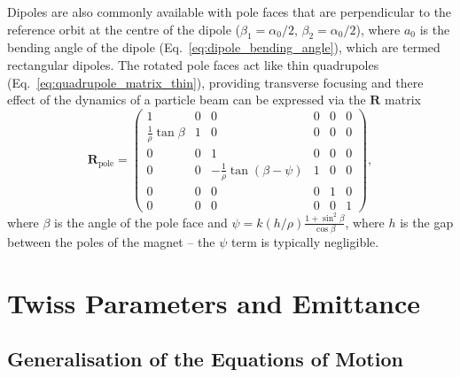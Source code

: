 \documentclass[../main.tex]{subfiles}
\begin{document}
Dipoles are also commonly available with pole faces that are perpendicular to the reference orbit at the centre of the dipole ($\beta_{1}=\alpha_{0}/2$, $\beta_{2}=\alpha_{0}/2$), where $a_{0}$ is the bending angle of the dipole (Eq.~\ref{eq:dipole_bending_angle}), which are termed rectangular dipoles. The rotated pole faces act like thin quadrupoles (Eq.~\ref{eq:quadrupole_matrix_thin}), providing transverse focusing and there effect of the dynamics of a particle beam can be expressed via the $\boldsymbol{R}$ matrix
\begin{equation}
\boldsymbol{R}_{\mathrm{pole}} =
\begin{pmatrix}
1 & 0 & 0 & 0 & 0 & 0 \\
\frac{1}{\rho}\tan\beta & 1 & 0 & 0 & 0 & 0 \\
0 & 0 & 1 & 0 & 0 & 0 \\
0 & 0 & -\frac{1}{\rho}\tan\left(\beta-\psi\right) & 1 & 0 & 0 \\
0 & 0 & 0 & 0 & 1 & 0 \\
0 & 0 & 0 & 0 & 0 & 1
\end{pmatrix},
\label{eq:pole_face_matrix}    
\end{equation}
where $\beta$ is the angle of the pole face and $\psi = k\left(h/\rho\right)\frac{1+\sin^{2}\beta}{\cos\beta}$, where $h$ is the gap between the poles of the magnet -- the $\psi$ term is typically negligible. 

\section{Twiss Parameters and Emittance}

\subsection{Generalisation of the Equations of Motion}
\end{document}
